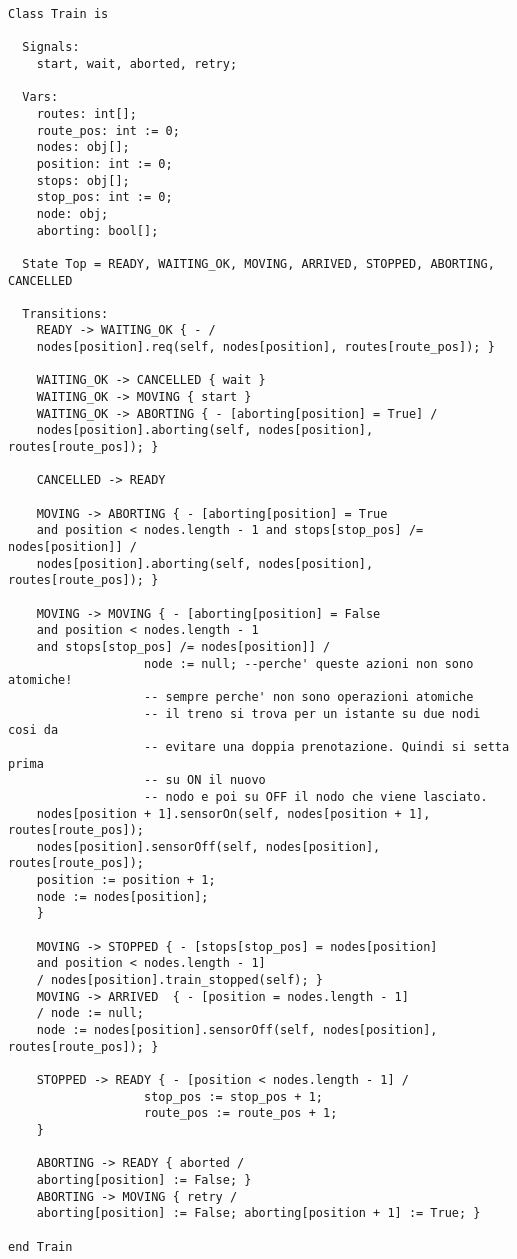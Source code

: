 \label{cap:code}
\begin{lstlisting}[caption={modello della classe Train}]
Class Train is

  Signals:
    start, wait, aborted, retry;

  Vars:
    routes: int[];
    route_pos: int := 0;
    nodes: obj[];
    position: int := 0;
    stops: obj[];
    stop_pos: int := 0;
    node: obj;
    aborting: bool[];

  State Top = READY, WAITING_OK, MOVING, ARRIVED, STOPPED, ABORTING, CANCELLED

  Transitions:
    READY -> WAITING_OK { - / 
    nodes[position].req(self, nodes[position], routes[route_pos]); }

    WAITING_OK -> CANCELLED { wait }  
    WAITING_OK -> MOVING { start }
    WAITING_OK -> ABORTING { - [aborting[position] = True] / 
    nodes[position].aborting(self, nodes[position], routes[route_pos]); }
    
    CANCELLED -> READY

    MOVING -> ABORTING { - [aborting[position] = True 
    and position < nodes.length - 1 and stops[stop_pos] /= nodes[position]] / 
    nodes[position].aborting(self, nodes[position], routes[route_pos]); }
    
    MOVING -> MOVING { - [aborting[position] = False 
    and position < nodes.length - 1 
    and stops[stop_pos] /= nodes[position]] /                    
                   node := null; --perche' queste azioni non sono atomiche!
                   -- sempre perche' non sono operazioni atomiche
                   -- il treno si trova per un istante su due nodi cosi da
                   -- evitare una doppia prenotazione. Quindi si setta prima 
                   -- su ON il nuovo
                   -- nodo e poi su OFF il nodo che viene lasciato.
    nodes[position + 1].sensorOn(self, nodes[position + 1], routes[route_pos]);
    nodes[position].sensorOff(self, nodes[position], routes[route_pos]);
    position := position + 1;
    node := nodes[position];
    }

    MOVING -> STOPPED { - [stops[stop_pos] = nodes[position] 
    and position < nodes.length - 1] 
    / nodes[position].train_stopped(self); }
    MOVING -> ARRIVED  { - [position = nodes.length - 1] 
    / node := null; 
    node := nodes[position].sensorOff(self, nodes[position], routes[route_pos]); }
    
    STOPPED -> READY { - [position < nodes.length - 1] /
                   stop_pos := stop_pos + 1;
                   route_pos := route_pos + 1;
    }
    
    ABORTING -> READY { aborted / 
    aborting[position] := False; }
    ABORTING -> MOVING { retry / 
    aborting[position] := False; aborting[position + 1] := True; }

end Train
\end{lstlisting}
